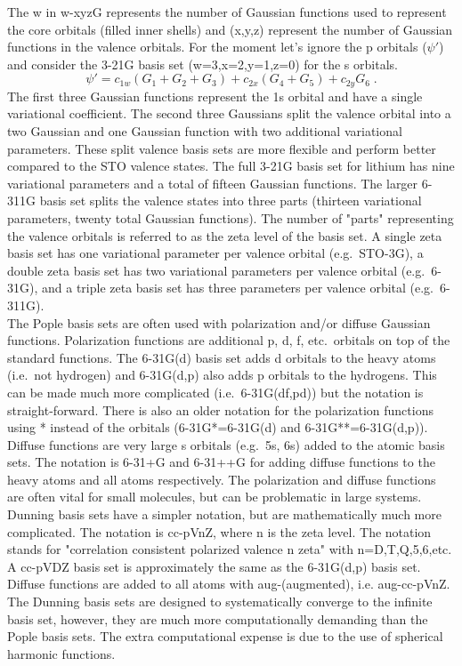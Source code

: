 \documentclass[12pt]{report}
\begin{document}
The w in w-xyzG represents the number of Gaussian functions used to represent
the core orbitals (filled inner shells) and (x,y,z) represent the number of
Gaussian functions in the valence orbitals.
For the moment let's ignore the p orbitals ($\psi'$) and consider the 3-21G
basis set (w=3,x=2,y=1,z=0) for the s orbitals.
\begin{equation}
 \psi' = c_{1w}(G_1+G_2+G_3)+c_{2x}(G_4+G_5)+c_{2y}G_6 \; .
\end{equation}
The first three Gaussian functions represent the 1s orbital and have a single
variational coefficient.
The second three Gaussians split the valence orbital into a two Gaussian and
one Gaussian function with two additional variational parameters.
These split valence basis sets are more flexible and perform better compared
to the STO valence states.
The full 3-21G basis set for lithium has nine variational parameters and a
total of fifteen Gaussian functions.
The larger 6-311G basis set splits the valence states into three parts
(thirteen variational parameters, twenty total Gaussian functions).
The number of "parts" representing the valence orbitals is referred to as the
zeta level of the basis set.
A single zeta basis set has one variational parameter per valence orbital
(e.g.\ STO-3G), a double zeta basis set has two variational parameters per
valence orbital (e.g.\ 6-31G), and a triple zeta basis set has three parameters
per valence orbital (e.g.\ 6-311G). \\

The Pople basis sets are often used with polarization and/or diffuse Gaussian
functions.
Polarization functions are additional p, d, f, etc.\ orbitals on top of the
standard functions.
The 6-31G(d) basis set adds d orbitals to the heavy atoms (i.e.\ not hydrogen)
and 6-31G(d,p) also adds p orbitals to the hydrogens.
This can be made much more complicated (i.e.\ 6-31G(df,pd)) but the notation is
straight-forward.
There is also an older notation for the polarization functions using * instead
of the orbitals (6-31G*=6-31G(d) and 6-31G**=6-31G(d,p)).
Diffuse functions are very large s orbitals (e.g.\ 5s, 6s) added to the atomic
basis sets.
The notation is 6-31+G and 6-31++G for adding diffuse functions to the heavy
atoms and all atoms respectively.
The polarization and diffuse functions are often vital for small molecules,
but can be problematic in large systems. \\

Dunning basis sets have a simpler notation, but are mathematically much more
complicated.
The notation is cc-pVnZ, where n is the zeta level.
The notation stands for "correlation consistent polarized valence n zeta"
with n=D,T,Q,5,6,etc.
A cc-pVDZ basis set is approximately the same as the 6-31G(d,p) basis set.
Diffuse functions are added to all atoms with aug-(augmented), i.e.
aug-cc-pVnZ.
The Dunning basis sets are designed to systematically converge to the infinite
basis set, however, they are much more computationally demanding than the
Pople basis sets.
The extra computational expense is due to the use of spherical harmonic
functions.
\end{document}
